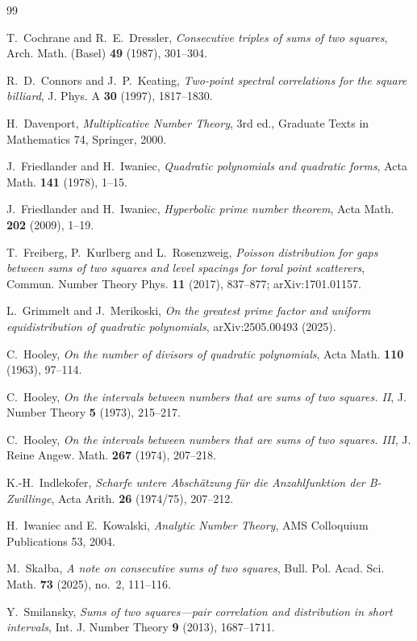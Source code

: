 \documentclass[11pt]{amsart}
\theoremstyle{remark}
\theoremstyle{definition}
\numberwithin{equation}{section}
\begin{document}
\begin{thebibliography}{99}

 T.~Cochrane and R.~E.~Dressler, \emph{Consecutive triples of sums of two squares}, Arch. Math. (Basel) \textbf{49} (1987), 301--304.

 R.~D.~Connors and J.~P.~Keating, \emph{Two-point spectral correlations for the square billiard}, J. Phys. A \textbf{30} (1997), 1817--1830.

 H.~Davenport, \emph{Multiplicative Number Theory}, 3rd ed., Graduate Texts in Mathematics 74, Springer, 2000.

 J.~Friedlander and H.~Iwaniec, \emph{Quadratic polynomials and quadratic forms}, Acta Math. \textbf{141} (1978), 1--15.

 J.~Friedlander and H.~Iwaniec, \emph{Hyperbolic prime number theorem}, Acta Math. \textbf{202} (2009), 1--19.

 T.~Freiberg, P.~Kurlberg and L.~Rosenzweig, \emph{Poisson distribution for gaps between sums of two squares and level spacings for toral point scatterers}, Commun. Number Theory Phys. \textbf{11} (2017), 837--877; arXiv:1701.01157.

 L.~Grimmelt and J.~Merikoski, \emph{On the greatest prime factor and uniform equidistribution of quadratic polynomials}, arXiv:2505.00493 (2025).

 C.~Hooley, \emph{On the number of divisors of quadratic polynomials}, Acta Math. \textbf{110} (1963), 97--114.

 C.~Hooley, \emph{On the intervals between numbers that are sums of two squares. II}, J. Number Theory \textbf{5} (1973), 215--217.

 C.~Hooley, \emph{On the intervals between numbers that are sums of two squares. III}, J. Reine Angew. Math. \textbf{267} (1974), 207--218.

 K.-H.~Indlekofer, \emph{Scharfe untere Absch\"atzung f\"ur die Anzahlfunktion der B-Zwillinge}, Acta Arith. \textbf{26} (1974/75), 207--212.

 H.~Iwaniec and E.~Kowalski, \emph{Analytic Number Theory}, AMS Colloquium Publications 53, 2004.

 M.~Ska{\l}ba, \emph{A note on consecutive sums of two squares}, Bull. Pol. Acad. Sci. Math. \textbf{73} (2025), no.~2, 111--116.

 Y.~Smilansky, \emph{Sums of two squares---pair correlation and distribution in short intervals}, Int. J. Number Theory \textbf{9} (2013), 1687--1711.

\end{thebibliography}
\end{document}
